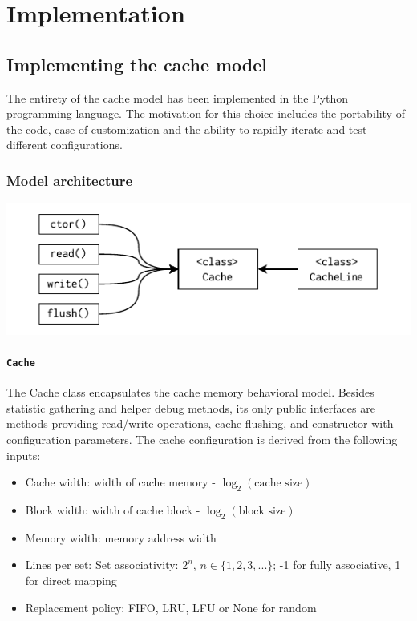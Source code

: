 
\chapter{Implementation}

\section{Implementing the cache model}

The entirety of the cache model has been implemented in the Python programming language. The motivation for this choice includes the portability of the code, ease of customization and
the ability to rapidly iterate and test different configurations.

\subsection{Model architecture}

\begin{center}
	\centering
	\includegraphics[width=\textwidth]{figures/04-implementation/cache_mdl_arch.pdf}
	\label{fig:cache_mdl_arch}
\end{center}

\subsubsection{\texttt{Cache}} \label{sec:cache_model}

The Cache class encapsulates the cache memory behavioral model. Besides statistic gathering and helper debug methods, its only public interfaces are methods
providing read/write operations, cache flushing, and constructor with configuration parameters. The cache configuration is derived from the following inputs:
\begin{itemize}
	\item Cache width: width of cache memory - $\log_2(\text{cache size})$
	\item Block width: width of cache block - $\log_2(\text{block size})$
	\item Memory width: memory address width
	\item Lines per set: Set associativity: $2^n,\, n \in \{1, 2, 3, ...\}$; -1 for fully associative, 1 for direct mapping
	\item Replacement policy: FIFO, LRU, LFU or None for random
\end{itemize}

